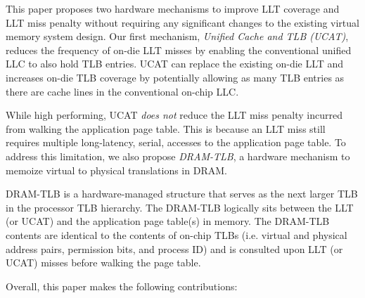 

This paper proposes two hardware mechanisms to improve LLT coverage and LLT miss penalty without requiring any significant changes to the existing virtual memory system design. Our first mechanism, {\em Unified Cache and TLB (UCAT)}, reduces the frequency of on-die LLT misses by enabling the conventional unified LLC to also hold TLB entries. UCAT can replace the existing on-die LLT and increases on-die TLB coverage by potentially allowing as many TLB entries as there are cache lines in the conventional on-chip LLC.


While high performing, UCAT {\em does not} reduce the LLT miss penalty incurred from walking the application page table. This is because an LLT miss still requires multiple long-latency, serial, accesses to the application page table. To address this limitation, we also propose {\em DRAM-TLB}, a hardware mechanism to memoize virtual to physical translations in DRAM.

DRAM-TLB is a hardware-managed structure that serves as the next
larger TLB in the processor TLB hierarchy. The DRAM-TLB logically sits
between the LLT (or UCAT) and the application page table(s) in memory. The
DRAM-TLB contents are identical to the contents of on-chip TLBs (i.e.
virtual and physical address pairs, permission bits, and process ID)
and is consulted upon LLT (or UCAT) misses before walking the page table.


Overall, this paper makes the following contributions:

